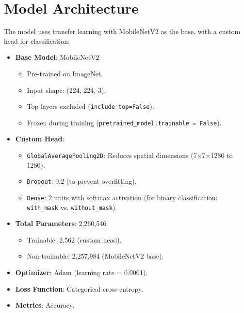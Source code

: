 \documentclass[a4paper,12pt]{article}
\begin{document}
\section{Model Architecture}
The model uses transfer learning with MobileNetV2 as the base, with a custom head for classification:
\begin{itemize}
    \item \textbf{Base Model}: MobileNetV2
        \begin{itemize}
            \item Pre-trained on ImageNet.
            \item Input shape: (224, 224, 3).
            \item Top layers excluded (\texttt{include\_top=False}).
            \item Frozen during training (\texttt{pretrained\_model.trainable = False}).
        \end{itemize}
    \item \textbf{Custom Head}:
        \begin{itemize}
            \item \texttt{GlobalAveragePooling2D}: Reduces spatial dimensions (7$\times$7$\times$1280 to 1280).
            \item \texttt{Dropout}: 0.2 (to prevent overfitting).
            \item \texttt{Dense}: 2 units with softmax activation (for binary classification: \texttt{with\_mask} vs. \texttt{without\_mask}).
        \end{itemize}
    \item \textbf{Total Parameters}: 2,260,546
        \begin{itemize}
            \item Trainable: 2,562 (custom head).
            \item Non-trainable: 2,257,984 (MobileNetV2 base).
        \end{itemize}
    \item \textbf{Optimizer}: Adam (learning rate = 0.0001).
    \item \textbf{Loss Function}: Categorical cross-entropy.
    \item \textbf{Metrics}: Accuracy.
\end{itemize}
\end{document}
